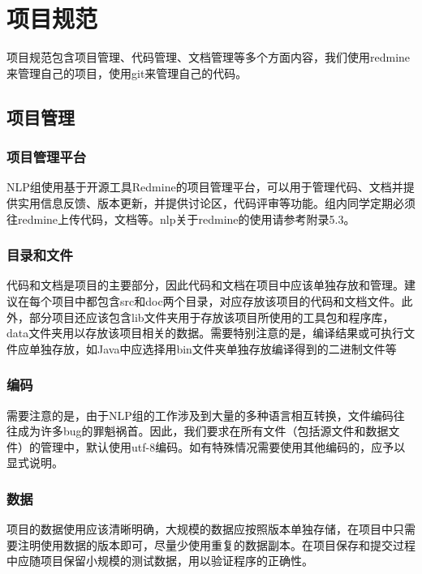 
\chapter{项目规范}
\label{chap03}

项目规范包含项目管理、代码管理、文档管理等多个方面内容，我们使用redmine来管理自己的项目，使用git来管理自己的代码。

\section{项目管理}

\subsection{项目管理平台}

NLP组使用基于开源工具Redmine的项目管理平台，可以用于管理代码、文档并提供实用信息反馈、版本更新，并提供讨论区，代码评审等功能。组内同学定期必须往redmine上传代码，文档等。nlp关于redmine的使用请参考附录5.3。

\subsection{目录和文件}

代码和文档是项目的主要部分，因此代码和文档在项目中应该单独存放和管理。建议在每个项目中都包含src和doc两个目录，对应存放该项目的代码和文档文件。此外，部分项目还应该包含lib文件夹用于存放该项目所使用的工具包和程序库，data文件夹用以存放该项目相关的数据。需要特别注意的是，编译结果或可执行文件应单独存放，如Java中应选择用bin文件夹单独存放编译得到的二进制文件等

\subsection{编码}

需要注意的是，由于NLP组的工作涉及到大量的多种语言相互转换，文件编码往往成为许多bug的罪魁祸首。因此，我们要求在所有文件（包括源文件和数据文件）的管理中，默认使用utf-8编码。如有特殊情况需要使用其他编码的，应予以显式说明。

\subsection{数据}

项目的数据使用应该清晰明确，大规模的数据应按照版本单独存储，在项目中只需要注明使用数据的版本即可，尽量少使用重复的数据副本。在项目保存和提交过程中应随项目保留小规模的测试数据，用以验证程序的正确性。



